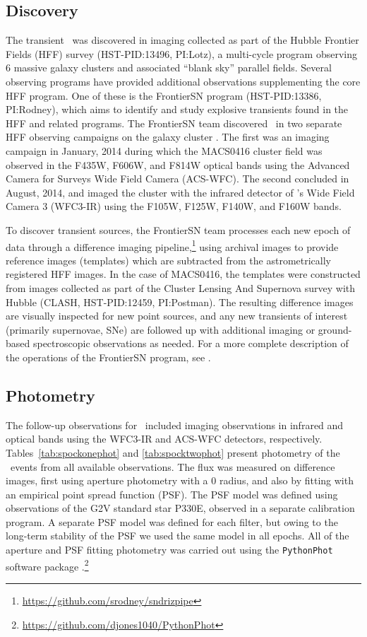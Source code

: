 \subsection{Discovery}\label{sec:Discovery}

The transient \spock\ was discovered in \HST imaging collected as part
of the Hubble Frontier Fields (HFF) survey (HST-PID:13496, PI:Lotz), a
multi-cycle program observing 6 massive galaxy clusters and associated
``blank sky'' parallel fields.  Several \HST observing programs have
provided additional observations supplementing the core HFF program.
One of these is the FrontierSN program (HST-PID:13386, PI:Rodney),
which aims to identify and study explosive transients found in the HFF
and related programs.  The FrontierSN team discovered \spock\ in two
separate HFF observing campaigns on the galaxy cluster .  The
first was an imaging campaign in January, 2014 during which the
MACS0416 cluster field was observed in the F435W, F606W, and F814W
optical bands using the Advanced Camera for Surveys Wide Field Camera
(ACS-WFC).  The second concluded in August, 2014, and imaged the
cluster with the infrared detector of \HST's Wide Field Camera 3
(WFC3-IR) using the F105W, F125W, F140W, and F160W bands.

To discover transient sources, the FrontierSN team processes each new
epoch of \HST data through a difference imaging
pipeline,\footnote{\url{https://github.com/srodney/sndrizpipe}} using
archival \HST images to provide reference images (templates) which are
subtracted from the astrometrically registered HFF images. In the case
of MACS0416, the templates were constructed from images collected as
part of the Cluster Lensing And Supernova survey with Hubble (CLASH,
HST-PID:12459, PI:Postman). The resulting difference images are
visually inspected for new point sources, and any new transients of
interest (primarily supernovae, SNe) are followed up with additional
\HST imaging or ground-based spectroscopic observations as needed.  For
a more complete description of the operations of the FrontierSN
program, see \citet{Rodney:2015a}.


\subsection{Photometry}\label{sec:Photometry}

The follow-up observations for \spock\ included \HST imaging
observations in infrared and optical bands using the WFC3-IR and
ACS-WFC detectors, respectively. Tables~\ref{tab:spockonephot} and
\ref{tab:spocktwophot} present photometry of the \spock\ events from
all available \HST observations. The flux was measured on difference
images, first using aperture photometry with a 0 radius, and
also by fitting with an empirical point spread function (PSF).  The
PSF model was defined using \HST observations of the G2V standard star
P330E, observed in a separate calibration program.  A separate PSF
model was defined for each filter, but owing to the long-term
stability of the \HST PSF we used the same model in all epochs.  All
of the aperture and PSF fitting photometry was carried out using the
{\tt PythonPhot} software package
\citep{Jones:2015}.\footnote{\url{https://github.com/djones1040/PythonPhot}}


